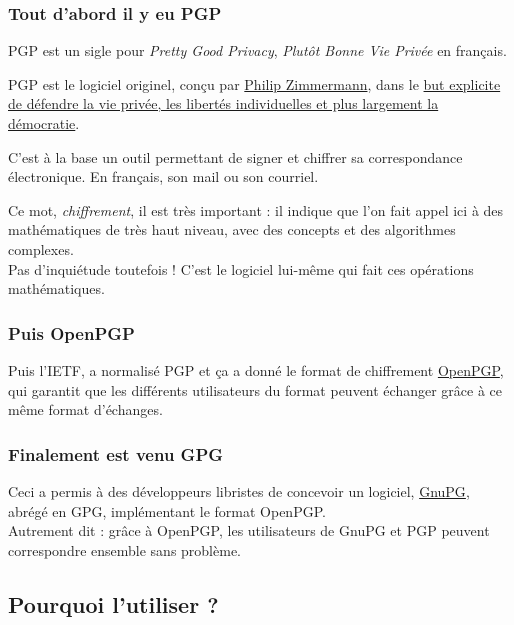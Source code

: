 \subsubsection{Tout d'abord il y eu PGP}\label{tout-dabord-il-y-eu-pgp}

PGP est un sigle pour \emph{Pretty Good Privacy}, \emph{Plutôt Bonne Vie Privée} en français.

PGP est le logiciel originel, conçu par \href{http://philzimmermann.com/FR/background/index.html}{Philip Zimmermann}, dans le
\href{http://openpgp.vie-privee.org/pourquoi.htm}{but explicite de
défendre la vie privée, les libertés individuelles et plus largement la
démocratie}.

C'est à la base un outil permettant de signer et chiffrer sa correspondance électronique. En français, son mail ou son courriel.

Ce mot, \emph{chiffrement}, il est très important : il indique que l'on
fait appel ici à des mathématiques de très haut niveau, avec des
concepts et des algorithmes complexes.\\Pas d'inquiétude toutefois !
C'est le logiciel lui-même qui fait ces opérations mathématiques.

\subsubsection{Puis OpenPGP}\label{puis-openpgp}

Puis l'IETF, a normalisé PGP et ça a donné le format de chiffrement
\href{https://fr.wikipedia.org/wiki/OpenPGP}{OpenPGP}, qui garantit que
les différents utilisateurs du format peuvent échanger grâce à ce même
format d'échanges.

\subsubsection{Finalement est venu GPG}\label{finalement-est-venu-gpg}

Ceci a permis à des développeurs libristes de concevoir un logiciel,
\href{https://www.gnupg.org/}{GnuPG}, abrégé en GPG, implémentant le
format OpenPGP.\\Autrement dit : grâce à OpenPGP, les utilisateurs de
GnuPG et PGP peuvent correspondre ensemble sans problème.

\subsection{Pourquoi l'utiliser ?}\label{pourquoi-lutiliser}

